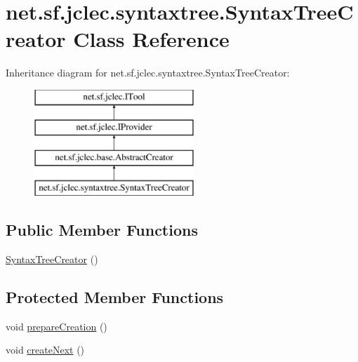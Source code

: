 \hypertarget{classnet_1_1sf_1_1jclec_1_1syntaxtree_1_1_syntax_tree_creator}{\section{net.\-sf.\-jclec.\-syntaxtree.\-Syntax\-Tree\-Creator Class Reference}
\label{classnet_1_1sf_1_1jclec_1_1syntaxtree_1_1_syntax_tree_creator}
}
Inheritance diagram for net.\-sf.\-jclec.\-syntaxtree.\-Syntax\-Tree\-Creator\-:\begin{figure}[H]
\begin{center}
\leavevmode
\includegraphics[height=4.000000cm]{classnet_1_1sf_1_1jclec_1_1syntaxtree_1_1_syntax_tree_creator}
\end{center}
\end{figure}
\subsection*{Public Member Functions}
\begin{DoxyCompactItemize}
\item 
\hyperlink{classnet_1_1sf_1_1jclec_1_1syntaxtree_1_1_syntax_tree_creator_a05dc8feb05f44f98d6febbb09668270f}{Syntax\-Tree\-Creator} ()
\end{DoxyCompactItemize}
\subsection*{Protected Member Functions}
\begin{DoxyCompactItemize}
\item 
void \hyperlink{classnet_1_1sf_1_1jclec_1_1syntaxtree_1_1_syntax_tree_creator_adf7abfdb8c0667909f2c751f5ea3c36e}{prepare\-Creation} ()
\item 
void \hyperlink{classnet_1_1sf_1_1jclec_1_1syntaxtree_1_1_syntax_tree_creator_a53ed3752c93350b456ff5cdc1b4bfbe8}{create\-Next} ()
\end{DoxyCompactItemize}

